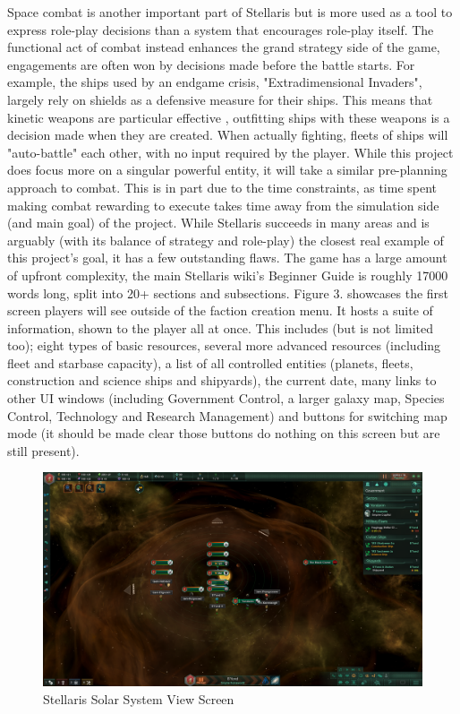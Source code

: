 \documentclass{report}
\begin{document}
Space combat is another important part of Stellaris but is more used as a tool to express role-play decisions than a system that encourages role-play itself. The functional act of combat instead enhances the grand strategy  side of the game, engagements are often won by decisions made before the battle starts. For example, the ships used by an endgame crisis, "Extradimensional Invaders", largely rely on shields as a defensive measure for their ships. This means that kinetic weapons are particular effective \cite{stellarisBattleDecision}, outfitting ships with these weapons is a decision made when they are created. When actually fighting, fleets of ships will "auto-battle" each other, with no input required by the player. While this project does focus more on a singular powerful entity, it will take a similar pre-planning approach to combat. This is in part due to the time constraints, as time spent making combat rewarding to execute takes time away from the simulation side (and main goal) of the project.
\newline
\newline
While Stellaris succeeds in many areas and is arguably (with its balance of strategy and role-play) the closest real example of this project's goal, it has a few outstanding flaws. The game has a large amount of upfront complexity, the main Stellaris wiki's Beginner Guide \cite{stellarisBeginner} is roughly 17000 words long, split into 20+ sections and subsections. Figure 3. showcases the first screen players will see outside of the faction creation menu. It hosts a suite of information, shown to the player all at once. This includes (but is not limited too); eight types of basic resources, several more advanced resources (including fleet and starbase capacity), a list of all controlled entities (planets, fleets, construction and science ships and shipyards), the current date, many links to other UI windows (including Government Control, a larger galaxy map, Species Control, Technology and Research Management) and buttons for switching map mode (it should be made clear those buttons do nothing on this screen but are still present).

\begin{figure}[H]
    \includegraphics[width=\textwidth]{stellaris_main_screen.png}
    \caption{Stellaris Solar System View Screen}
\end{figure}
\end{document}

